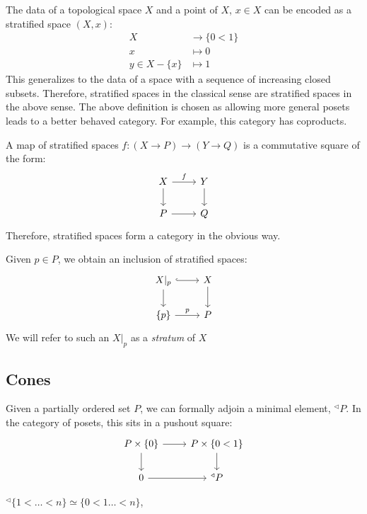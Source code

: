 \begin{ex}
    The data of a topological space $X$ and a point of $X$, $x \in X$
    can be encoded as a stratified space $(X, x)$:
\begin{align*}
X &\longrightarrow \{0 <1\} \\
x &\longmapsto 0 \\
y \in X - \{x\} & \longmapsto 1
\end{align*}
    This generalizes to the data of a space with a sequence of
    increasing closed subsets. Therefore, stratified spaces in the classical
    sense are stratified spaces in the above sense. The above definition is
    chosen as allowing more general posets leads to a better behaved category.
    For example, this category has coproducts. 
\end{ex}

\begin{defi}
A map of stratified spaces $f :(X\rightarrow P) \rightarrow (Y \rightarrow Q)$
is a commutative square of the form:
$$
\begin{tikzcd}
X \arrow[r, "f"] \arrow[d] & Y \arrow[d] \\
P \arrow[r]                & Q          
\end{tikzcd}
$$
Therefore, stratified spaces form a category in the obvious way. 
\end{defi}

\begin{ex}
Given $p \in P$, we obtain an inclusion of stratified spaces:
$$
\begin{tikzcd}
X|_p \arrow[d] \arrow[r, hook] & X \arrow[d] \\
\{p\} \arrow[r, "p"]           & P          
\end{tikzcd}
$$
We will refer to such an $X|_p$ as a \textit{stratum} of $X$
\end{ex}

\subsection{Cones}

Given a partially ordered set $P$, we can formally adjoin a minimal element,
$^\triangleleft P$. In the category of posets, this sits in a pushout square:
$$
\begin{tikzcd}
P \times \{0\} \arrow[r] \arrow[d] & P \times \{0<1\} \arrow[d] \\
{0} \arrow[r]                      & ^\triangleleft P          
\end{tikzcd}
$$
\begin{ex}
 $^\triangleleft \{ 1<\dots <n\} \simeq \{0 < 1 \dots < n\}$,
\end{ex}

